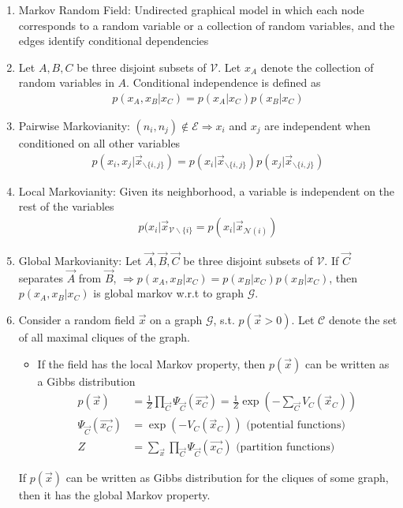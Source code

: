 \documentclass[12pt,twoside]{article}
\begin{document}
\begin{enumerate}

	\item Markov Random Field: Undirected graphical model in which each node corresponds to a random variable or a collection of random variables, and the edges identify conditional dependencies
	
	\item Let $A,B,C$ be three disjoint subsets of  $\mathcal{V}$. Let $x_A$ denote the collection of random variables in $A$. Conditional independence is defined as
	\begin{align*}
		p(x_A,x_B \vert x_C) =p(x_A \vert x_C)p(x_B \vert x_C)
	\end{align*}

	\item Pairwise Markovianity: $(n_i, n_j) \notin \mathcal{E} \Rightarrow x_i$ and $x_j$ are independent when conditioned on all other variables
		\begin{align*}
			p\left(x_i, x_j \vert \vec{x}_{\backslash\lbrace i, j\rbrace}\right) = p\left(x_i\vert \vec{x}_{\backslash\lbrace i, j\rbrace}\right)p \left(x_j\vert \vec{x}_{\backslash\lbrace i, j\rbrace}\right) 
		\end{align*}		
	 
	 \item Local Markovianity: Given its neighborhood, a variable is independent on the rest of the variables
		\begin{align*}
			p(x_i \vert \vec{x}_{\mathcal{V}\backslash \lbrace i \rbrace} = p(x_i \vert \vec{x}_{\mathcal{N}(i)})
		\end{align*}		 	
	 
	 \item Global Markovianity: Let $\vec{A}, \vec{B}, \vec{C}$ be three disjoint subsets of $\mathcal{V}$. If $\vec{C}$ separates $\vec{A}$ from $\vec{B}$, $\Rightarrow p(x_A, x_B \vert x_C) = p(x_B \vert x_C)p(x_B \vert x_C) $, then $p(x_A, x_B \vert x_C)$ is global markov w.r.t to graph $\mathcal{G}$.
	 
	\item Consider a random field $\vec{x}$ on a graph $\mathcal{G}$, s.t. $p(\vec{x}>0)$. Let $\mathcal{C}$ denote the set of all maximal cliques of the graph.
		\begin{itemize}
			\item If the field has the local Markov property, then $p(\vec{x})$ can be written as a Gibbs distribution
			\begin{align*}
				p(\vec{x}) &= \frac{1}{Z} \prod_{\vec{C}} \Psi_{\vec{C}}(\vec{x_C}) = \frac{1}{Z} \exp\left(-\sum_{\vec{C}} V_C(\vec{x}_C)\right)\\
				\Psi_{\vec{C}}(\vec{x_C}) & = \exp\left(-V_C(\vec{x}_C)\right) \text{ (potential functions)}\\
				Z & = \sum_{\vec{x}} \prod_{\vec{C}} \Psi_{\vec{C}}(\vec{x_C})  \text{ (partition functions)}
			\end{align*}
		\end{itemize}
		 If $p(\vec{x})$ can be written as Gibbs distribution for the cliques of some graph, then it has the global Markov property.	 
	 
\end{enumerate}
\end{document}
